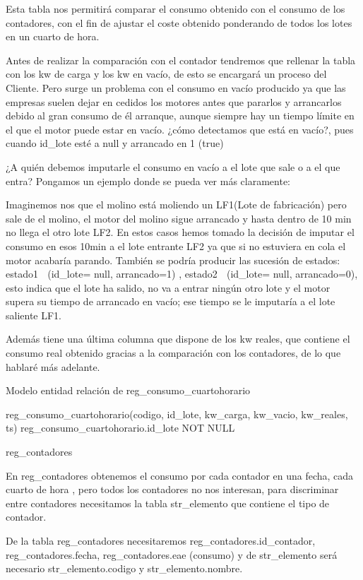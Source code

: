 Esta tabla nos permitirá comparar el consumo obtenido con el consumo de los contadores, 
con el fin de ajustar el coste obtenido ponderando de todos los lotes en un cuarto de hora.

Antes de realizar la comparación con el contador tendremos que rellenar la tabla con
 los kw de carga y los kw en vacío, de esto se encargará un proceso del Cliente. Pero
 surge un problema con el consumo en vacío producido ya que las empresas suelen 
dejar en cedidos los motores antes que pararlos y arrancarlos debido al gran consumo
 de él arranque, aunque siempre hay un tiempo límite en el que el motor puede estar
 en vacío. ¿cómo detectamos que está en vacío?, pues cuando id_lote esté a null y 
arrancado en 1 (true)

¿A quién debemos imputarle el consumo en vacío a el lote que sale o a el que entra?
 Pongamos un ejemplo donde se pueda ver más claramente:

Imaginemos nos que el molino está moliendo un LF1(Lote de fabricación) pero sale de
 el molino, el motor del molino sigue arrancado y hasta dentro de 10 min no llega el otro
 lote LF2. En estos casos hemos tomado la decisión de imputar el consumo en esos 10min
 a el lote entrante LF2 ya que si no estuviera en cola el motor acabaría parando.
 También se podría producir las sucesión de estados: estado1   (id_lote= null, arrancado=1) ,
 estado2  (id_lote= null, arrancado=0), esto indica que el lote ha salido, no va a entrar ningún 
otro lote y el motor supera su tiempo de arrancado en vacío; ese tiempo se le imputaría
 a el lote saliente LF1.

Además tiene una última columna que dispone de los kw reales, que contiene el consumo
 real obtenido gracias a la comparación con los contadores, de lo que hablaré más adelante.

Modelo entidad relación de reg_consumo_cuartohorario

reg_consumo_cuartohorario(codigo, id_lote, kw_carga, kw_vacio, kw_reales, ts)
reg_consumo_cuartohorario.id_lote NOT NULL

reg_contadores

En reg_contadores obtenemos el consumo por cada contador en una fecha, cada cuarto de hora
, pero todos los contadores no nos interesan, para discriminar entre contadores necesitamos la
 tabla str_elemento que contiene el tipo de contador.

De la tabla reg_contadores necesitaremos reg_contadores.id_contador, reg_contadores.fecha,
 reg_contadores.eae (consumo) y de str_elemento será necesario str_elemento.codigo y 
str_elemento.nombre.

